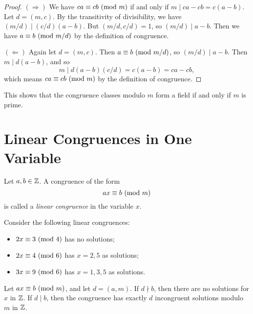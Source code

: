 \begin{proof}
  $(\Rightarrow)$ We have
  $ca \equiv cb \ (\mathrm{mod}\ m)$ if and only if
  $m \mid ca - cb = c(a - b)$. Let
  $d = (m, c)$. By the transitivity of
  divisibility, we have
  $(m / d) \mid (c / d)(a - b)$.
  But $(m / d, c / d) = 1$, so
  $(m / d) \mid a - b$. Then we
  have $a \equiv b \ (\mathrm{mod}\ m / d)$
  by the definition of congruence.

  $(\Leftarrow)$ Again let $d = (m, c)$.
  Then $a \equiv b \ (\mathrm{mod}\ m / d)$, so
  $(m / d) \mid a - b$. Then
  $m \mid d(a - b)$, and so
  \[
    m \mid d(a - b)(c / d)
    = c(a - b) = ca - cb,
  \]
  which means $ca \equiv cb \ (\mathrm{mod}\ m)$
  by the definition of congruence.
\end{proof}

\begin{remark}
  This shows that the congruence
  classes modulo $m$ form a field if
  and only if $m$ is prime.
\end{remark}

\section{Linear Congruences in One Variable}

\begin{definition}
  Let $a, b \in \mathbb{Z}$. A congruence of
  the form
  \[
    ax \equiv b \ (\mathrm{mod}\ m)
  \]
  is called a \emph{linear congruence} in
  the variable $x$.
\end{definition}

\begin{example}
  Consider the following linear congruences:
  \begin{itemize}
    \item $2x \equiv 3 \ (\mathrm{mod}\ 4)$
      has no solutions;
    \item $2x \equiv 4 \ (\mathrm{mod}\ 6)$
      has $x = 2, 5$ as solutions;
    \item $3x \equiv 9 \ (\mathrm{mod}\ 6)$ has
      $x = 1, 3, 5$ as solutions.
  \end{itemize}
\end{example}

\begin{theorem}
  Let $ax \equiv b \ (\mathrm{mod}\ m)$, and
  let $d = (a, m)$. If $d \nmid b$, then
  there are no solutions for $x$ in $\mathbb{Z}$. If
  $d \mid b$, then the congruence
  has exactly $d$ incongruent solutions
  modulo $m$ in $\mathbb{Z}$.
\end{theorem}

